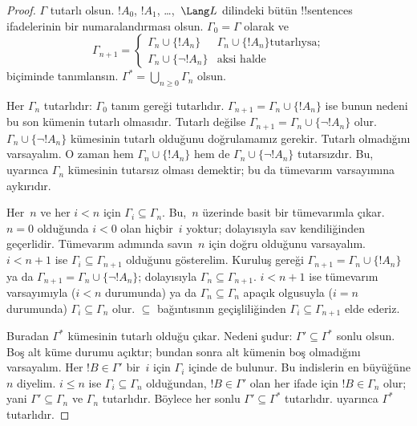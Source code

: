 \documentclass[../../../include/open-logic-section]{subfiles}
\begin{document}
\begin{proof}
$\Gamma$ tutarlı olsun. $!A_0$, $!A_1$, \dots,~$\Lang L$ dilindeki
bütün !!{sentence}s ifadelerinin bir numaralandırması olsun.
$\Gamma_0=\Gamma$ olarak ve
\[
\Gamma_{n+1} =
\begin{cases}
\Gamma_n \cup \{ !A_n \} & \textrm{$\Gamma_n \cup \{!A_n\}$
  tutarlıysa;} \\
\Gamma_n \cup \{ \lnot !A_n \} & \textrm{aksi halde}
\end{cases}
\]
biçiminde tanımlansın. $\Gamma^*=\bigcup_{n\geq0}\Gamma_n$ olsun.

Her $\Gamma_n$ tutarlıdır: $\Gamma_0$ tanım gereği tutarlıdır.
$\Gamma_{n+1}=\Gamma_n\cup\{!A_n\}$ ise bunun nedeni bu son kümenin
tutarlı olmasıdır. Tutarlı değilse $\Gamma_{n+1}=\Gamma_n\cup
\{\lnot !A_n\}$ olur. $\Gamma_n\cup\{\lnot !A_n\}$ kümesinin tutarlı
olduğunu doğrulamamız gerekir. Tutarlı olmadığını varsayalım. O zaman
hem $\Gamma_n\cup\{!A_n\}$ hem de $\Gamma_n\cup\{\lnot !A_n\}$
tutarsızdır. Bu,
uyarınca $\Gamma_n$ kümesinin tutarsız olması demektir; bu da
tümevarım varsayımına aykırıdır.

Her~$n$ ve her $i<n$ için $\Gamma_i\subseteq\Gamma_n$. Bu,~$n$
üzerinde basit bir tümevarımla çıkar. $n=0$ olduğunda $i<0$ olan
hiçbir~$i$ yoktur; dolayısıyla sav kendiliğinden geçerlidir. Tümevarım
adımında savın~$n$ için doğru olduğunu varsayalım. $i<n+1$ ise
$\Gamma_i\subseteq\Gamma_{n+1}$ olduğunu gösterelim. Kuruluş gereği
$\Gamma_{n+1}=\Gamma_n\cup\{!A_n\}$ ya da
$\Gamma_{n+1}=\Gamma_n\cup\{\lnot !A_n\}$; dolayısıyla
$\Gamma_n\subseteq\Gamma_{n+1}$. $i<n+1$ ise tümevarım varsayımıyla
($i<n$ durumunda) ya da $\Gamma_n\subseteq\Gamma_n$ apaçık olgusuyla
($i=n$ durumunda) $\Gamma_i\subseteq\Gamma_n$ olur. $\subseteq$
bağıntısının geçişliliğinden $\Gamma_i\subseteq\Gamma_{n+1}$ elde
ederiz.

Buradan $\Gamma^*$ kümesinin tutarlı olduğu çıkar. Nedeni şudur:
$\Gamma'\subseteq\Gamma^*$ sonlu olsun. Boş alt küme durumu açıktır;
bundan sonra alt kümenin boş olmadığını varsayalım. Her
$!B\in\Gamma'$ bir~$i$ için $\Gamma_i$ içinde de bulunur. Bu indislerin en büyüğüne
$n$ diyelim. $i\leq n$ ise $\Gamma_i\subseteq\Gamma_n$ olduğundan,
$!B\in\Gamma'$ olan her ifade için $!B\in\Gamma_n$ olur; yani
$\Gamma'\subseteq\Gamma_n$ ve $\Gamma_n$ tutarlıdır. Böylece
her sonlu $\Gamma'\subseteq\Gamma^*$ tutarlıdır.
uyarınca $\Gamma^*$ tutarlıdır.


\end{proof}
\end{document}
